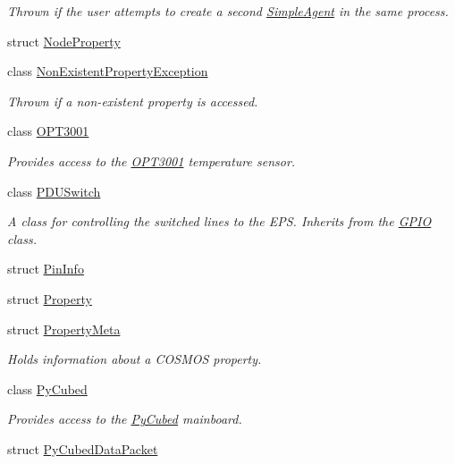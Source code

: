 \begin{DoxyCompactItemize}
\begin{DoxyCompactList}\small\item\em Thrown if the user attempts to create a second \hyperlink{classcubesat_1_1SimpleAgent}{Simple\+Agent} in the same process. \end{DoxyCompactList}\item 
struct \hyperlink{structcubesat_1_1NodeProperty}{Node\+Property}
\item 
class \hyperlink{classcubesat_1_1NonExistentPropertyException}{Non\+Existent\+Property\+Exception}
\begin{DoxyCompactList}\small\item\em Thrown if a non-\/existent property is accessed. \end{DoxyCompactList}\item 
class \hyperlink{classcubesat_1_1OPT3001}{O\+P\+T3001}
\begin{DoxyCompactList}\small\item\em Provides access to the \hyperlink{classcubesat_1_1OPT3001}{O\+P\+T3001} temperature sensor. \end{DoxyCompactList}\item 
class \hyperlink{classcubesat_1_1PDUSwitch}{P\+D\+U\+Switch}
\begin{DoxyCompactList}\small\item\em A class for controlling the switched lines to the E\+PS. Inherits from the \hyperlink{classcubesat_1_1GPIO}{G\+P\+IO} class. \end{DoxyCompactList}\item 
struct \hyperlink{structcubesat_1_1PinInfo}{Pin\+Info}
\item 
struct \hyperlink{structcubesat_1_1Property}{Property}
\item 
struct \hyperlink{structcubesat_1_1PropertyMeta}{Property\+Meta}
\begin{DoxyCompactList}\small\item\em Holds information about a C\+O\+S\+M\+OS property. \end{DoxyCompactList}\item 
class \hyperlink{classcubesat_1_1PyCubed}{Py\+Cubed}
\begin{DoxyCompactList}\small\item\em Provides access to the \hyperlink{classcubesat_1_1PyCubed}{Py\+Cubed} mainboard. \end{DoxyCompactList}\item 
struct \hyperlink{structcubesat_1_1PyCubedDataPacket}{Py\+Cubed\+Data\+Packet}

\end{DoxyCompactItemize}
